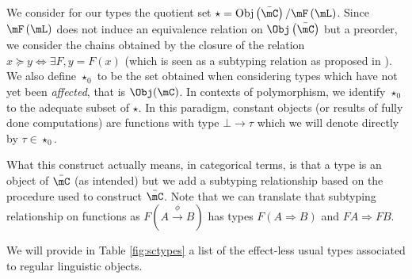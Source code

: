 \documentclass[math, english, info]{cours}
\begin{document}
We consider for our types the quotient set $\star = \mathrm{Obj}\left( \bar{\mC} \right)/\mF\left( \mL \right)$.
Since $\mF\left( \mL \right)$ does not induce an equivalence relation on $\Obj\left( \bar{\mC} \right)$ but a preorder, we consider the chains obtained by the closure of the relation $x\succeq y \Leftrightarrow \exists F, y = F(x)$ (which is seen as a subtyping relation as proposed in ).
We also define $\star_{0}$ to be the set obtained when considering types which have not yet been \emph{affected}, that is $\Obj(\mC)$.
In contexts of polymorphism, we identify $\star_{0}$ to the adequate subset of $\star$.
In this paradigm, constant objects (or results of fully done computations) are functions with type $\bot \to \tau$ which we will denote directly by $\tau \in \star_{0}$.

What this construct actually means, in categorical terms, is that a type is an object of $\bar{\mC}$ (as intended) but we add a subtyping relationship based on the procedure used to construct $\bar{\mC}$.
Note that we can translate that subtyping relationship on functions as $F\left( A \xrightarrow{\phi} B \right)$ has types $F\left( A\Rightarrow B \right)$ and $FA \Rightarrow FB$.

We will provide in Table \ref{fig:sctypes} a list of the effect-less usual types associated to regular linguistic objects.
\end{document}
